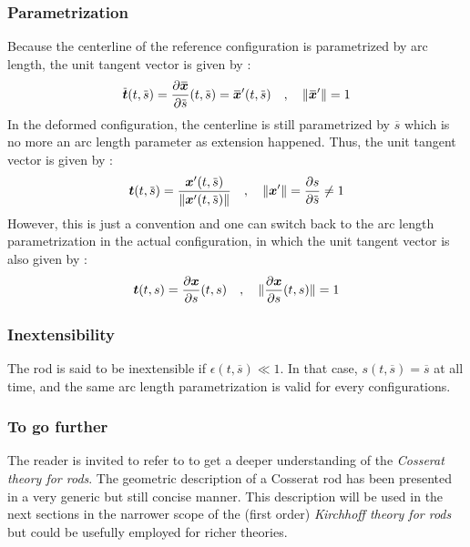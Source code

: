 \subsubsection{Parametrization}

Because the centerline of the reference configuration is parametrized by arc length, the unit tangent vector is given by :
\begin{equation}	
	\overbar{\vect{t}}(t, \overbar{s}) = \frac{\partial \overbar{\vect{x}}}{\partial \overbar{s}} (t, \overbar{s}) = \overbar{\vect{x}}'(t, \overbar{s})
	\quad , \quad
	\norm{\overbar{\vect{x}}'} = 1
\end{equation}
In the deformed configuration, the centerline is still parametrized by $\overbar{s}$ which is no more an arc length parameter as extension happened. Thus, the unit tangent vector is given by :
\begin{equation}	
	\vect{t}(t, \overbar{s}) = \frac{{\vect{x}}'(t, \overbar{s})}{\norm{{\vect{x}}'(t, \overbar{s})}}
	\quad , \quad
	\norm{\vect{x}'} = \frac{\partial s}{\partial \overbar{s}}  \neq 1
\end{equation}
However, this is just a convention and one can switch back to the arc length parametrization in the actual configuration, in which the unit tangent vector is also given by :
\begin{equation}	
	\boldsymbol{t}(t, s) = \frac{\partial \boldsymbol{x}}{\partial s} (t, s)
	\quad , \quad
	\lVert \frac{\partial \boldsymbol{x}}{\partial s} (t, s)\rVert = 1
\end{equation}

\subsubsection{Inextensibility}

The rod is said to be inextensible if $\epsilon(t, \overbar{s}) \ll 1$. In that case, $s(t, \overbar{s}) = \overbar{s}$ at all time, and the same arc length parametrization is valid for every configurations.

\subsubsection{To go further}

The reader is invited to refer to \cite{Antman2005} to get a deeper understanding of the \emph{Cosserat theory for rods}. The geometric description of a Cosserat rod has been presented in a very generic but still concise manner. This description will be used in the next sections in the narrower scope of the (first order) \emph{Kirchhoff theory for rods} but could be usefully employed for richer theories. 

